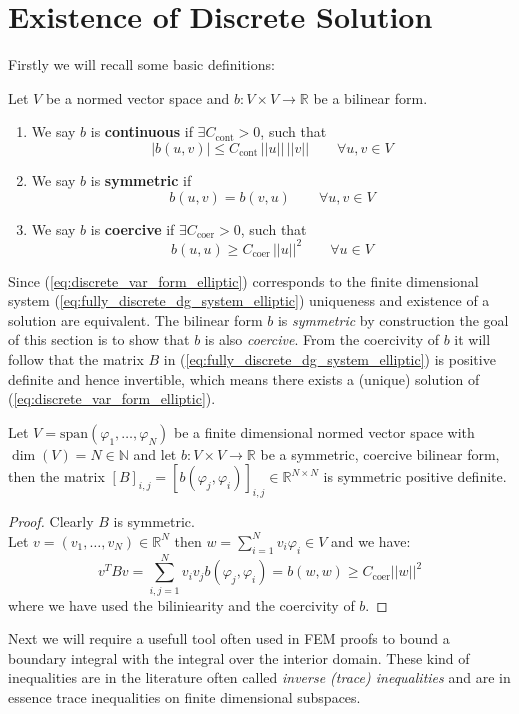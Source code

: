 \section{Existence of Discrete Solution}
Firstly we will recall some basic definitions:
\begin{definition} Let $V$ be a normed vector space and $b:V\times V \to \mathbb{R}$
    be a bilinear form.
    \begin{enumerate}[label=\textnormal{(\roman*)}]
        \item We say $b$ is \textbf{continuous} if $\exists C_{\text{cont}}>0$, such that
        \[
            |b(u,v)|\leq C_{\text{cont}}\, ||u||\, ||v|| \qquad \forall u,v \in V
        \]
        \item We say $b$ is \textbf{symmetric} if 
        \[  
            b(u,v) = b(v,u) \qquad \forall u,v \in V
        \]
        \item We say $b$ is \textbf{coercive} if $\exists C_{\text{coer}}>0$, such that
        \[
            b(u,u)\geq C_{\text{coer}}\, ||u||^2 \qquad \forall u \in V
        \]
    \end{enumerate}
    
\end{definition}


Since (\ref{eq:discrete_var_form_elliptic}) corresponds to the finite dimensional
system (\ref{eq:fully_discrete_dg_system_elliptic}) uniqueness and existence of a solution
are equivalent. 
The bilinear form $b$ is \textit{symmetric} by construction 
the goal of this section is to show that $b$ is also \textit{coercive}. 
From the coercivity of $b$ it will follow that the matrix $B$ in (\ref{eq:fully_discrete_dg_system_elliptic})
is positive definite and hence invertible, which means there exists a (unique) solution
of (\ref{eq:discrete_var_form_elliptic}).
\begin{lemma}
    Let $V = \text{span}(\varphi_1,\ldots,\varphi_N)$ be a finite dimensional 
    normed vector space with $\dim(V) = N\in \mathbb{N}$ and let
    $b:V \times V \to \mathbb{R}$ be a symmetric, coercive bilinear form,
    then the matrix ${[B]}_{i,j} = {[b(\varphi_j, \varphi_i)]}_{i,j}\in \mathbb{R}^{N\times N}$
    is symmetric positive definite.
\end{lemma}
\begin{proof}
    Clearly $B$ is symmetric. \\
    Let $v=(v_1,\ldots,v_N)\in \mathbb{R}^N$ then $w = \sum_{i=1}^{N}
    v_i \varphi_i\in V$ and we have:
    \[
        v^{T}Bv = \sum_{i,j=1}^{N}v_i v_j b(\varphi_j,\varphi_i) = b(w,w) \geq
        C_{\text{coer}} ||w||^2
    \]
    where we have used the biliniearity and the coercivity of $b$.
\end{proof}
Next we will require a usefull tool often used in FEM proofs to bound
a boundary integral with the integral over the interior domain. These kind
of inequalities are in the literature often called \textit{inverse (trace) inequalities}
and are in essence trace inequalities on finite dimensional subspaces.


